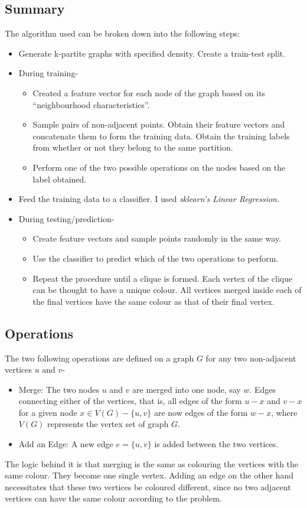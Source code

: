 \documentclass[a4paper]{report}
\begin{document}
\subsection{Summary}
The algorithm used can be broken down into the following steps:
\begin{itemize}
    \item Generate k-partite graphs with specified density. Create a train-test split.
    \item During training-
        \begin{itemize}
            \item Created a feature vector for each node of the graph based on its ``neighbourhood characteristics''.
            \item Sample pairs of non-adjacent points. Obtain their feature vectors and concatenate them
                to form the training data. Obtain the training labels from whether or not they belong to the
                same partition.
            \item Perform one of the two possible operations on the nodes based on the label obtained.
        \end{itemize}
    \item Feed the training data to a classifier. I used \textit{sklearn's Linear Regression}.
    \item During testing/prediction-
        \begin{itemize}
            \item Create feature vectors and sample points randomly in the same way.
            \item Use the classifier to predict which of the two operations to perform.
            \item Repeat the procedure until a clique is formed. Each vertex of the clique can be
                thought to have a unique colour. All vertices merged inside each of the final vertices
                have the same colour as that of their final vertex.
        \end{itemize}
\end{itemize}
\subsection{Operations}
The two following operations are defined on a graph $G$
for any two non-adjacent vertices $u$ and $v$-
\begin{itemize}
    \item Merge: The two nodes $u$ and $v$ are merged into one node, say $w$.
        Edges connecting either of the vertices, that is, all edges of the form
        $u-x$ and $v-x$ for a given node $x \in V(G)-\{u, v\}$ are now edges of
        the form $w-x$, where $V(G)$ represents the vertex set of graph $G$.
    \item Add an Edge: A new edge $e = \{u, v\}$ is added between the two vertices.
\end{itemize}
The logic behind it is that merging is the same as colouring the vertices with the same colour.
They become one single vertex. Adding an edge on the other hand necessitates that these two 
vertices be coloured different, since no two adjacent vertices can have the same colour according to the problem.
\end{document}
